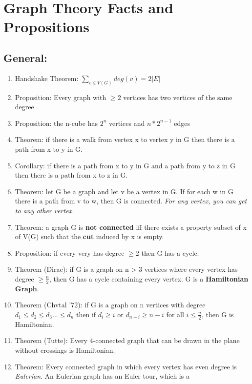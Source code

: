 \documentclass[]{article}
\author{}
\date{}
\begin{document}
\section{Graph Theory Facts and
Propositions}\label{graph-theory-facts-and-propositions}

\subsection{General:}\label{general}

\begin{enumerate}
\def\labelenumi{\arabic{enumi}.}
\item
  Handshake Theorem: $\sum_{v \in V(G)} deg(v) = 2|E|$
\item
  Proposition: Every graph with $\geq 2$ vertices has two vertices of
  the same degree
\item
  Proposition: the n-cube has $2^n$ vertices and $n*2^{n-1}$ edges
\item
  Theorem: if there is a walk from vertex x to vertex y in G then there
  is a path from x to y in G.
\item
  Corollary: if there is a path from x to y in G and a path from y to z
  in G then there is a path from x to z in G.
\item
  Theorem: let G be a graph and let v be a vertex in G. If for each w in
  G there is a path from v to w, then G is connected. \emph{For any
  vertex, you can get to any other vertex.}
\item
  Theorem: a graph G is \textbf{not connected} iff there exists a
  property subset of x of V(G) such that the \textbf{cut} induced by x
  is empty.
\item
  Proposition: if every very has degree $\geq 2$ then G has a cycle.
\item
  Theorem (Dirac): if G is a graph on n \textgreater{} 3 vertices where
  every vertex has degree $\geq \frac{n}{2}$, then G has a cycle
  containing every vertex. G is a \textbf{Hamiltonian Graph}.
\item
  Theorem (Chvtal '72): if G is a graph on n vertices with degree
  $d_1 \leq d_2 \leq d_3 ... \leq d_n$ then if $d_i \geq i$ or
  $d_{n-i} \geq n - i$ for all $i \leq \frac{n}{2}$, then G is
  Hamiltonian.
\item
  Theorem (Tutte): Every 4-connected graph that can be drawn in the
  plane without crossings is Hamiltonian.
\item
  Theorem: Every connected graph in which every vertex has even degree
  is \emph{Eulerian}. An Eulerian graph has an Euler tour, which is a

\end{enumerate}
\end{document}
